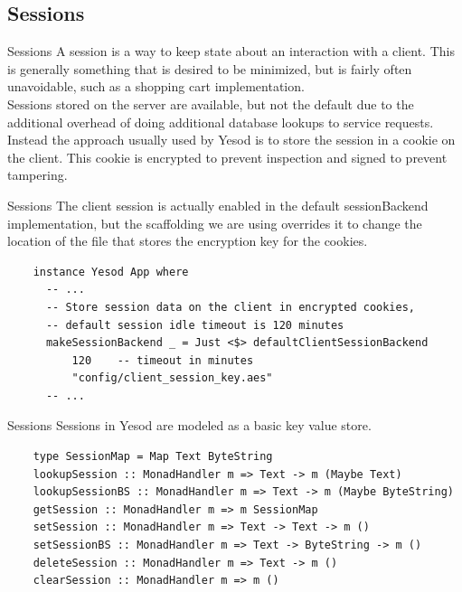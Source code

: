 \documentclass[pdf]{beamer}
\begin{document}
\subsection{Sessions}

\begin{frame}{Sessions}
  A session is a way to keep state about an interaction with a
  client. This is generally something that is desired to be minimized,
  but is fairly often unavoidable, such as a shopping cart
  implementation. \\

  Sessions stored on the server are available, but not the default due
  to the additional overhead of doing additional database lookups to
  service requests. \\

  Instead the approach usually used by Yesod is to store the session
  in a cookie on the client. This cookie is encrypted to prevent
  inspection and signed to prevent tampering.
\end{frame}

\begin{frame}[fragile]{Sessions}
  The client session is actually enabled in the default sessionBackend
  implementation, but the scaffolding we are using overrides it to
  change the location of the file that stores the encryption key for
  the cookies. \\

  \begin{verbatim}
    instance Yesod App where
      -- ...
      -- Store session data on the client in encrypted cookies,
      -- default session idle timeout is 120 minutes
      makeSessionBackend _ = Just <$> defaultClientSessionBackend
          120    -- timeout in minutes
          "config/client_session_key.aes"
      -- ...
  \end{verbatim}
\end{frame}

\begin{frame}[fragile]{Sessions}
  Sessions in Yesod are modeled as a basic key value store. \\

  \begin{verbatim}
    type SessionMap = Map Text ByteString
    lookupSession :: MonadHandler m => Text -> m (Maybe Text)
    lookupSessionBS :: MonadHandler m => Text -> m (Maybe ByteString)
    getSession :: MonadHandler m => m SessionMap
    setSession :: MonadHandler m => Text -> Text -> m ()
    setSessionBS :: MonadHandler m => Text -> ByteString -> m ()
    deleteSession :: MonadHandler m => Text -> m ()
    clearSession :: MonadHandler m => m ()
  \end{verbatim}
\end{frame}
\end{document}
